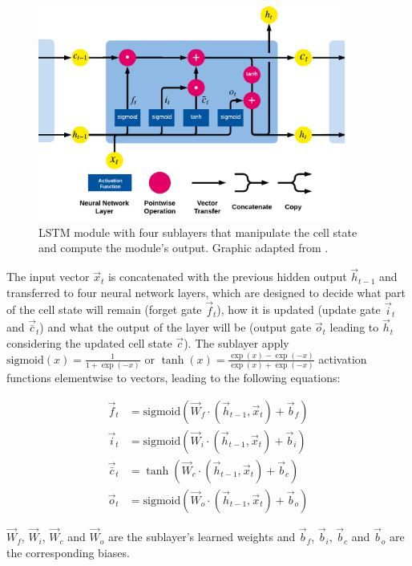 \begin{figure}[htbp!]
	\centering
	\includegraphics[width=0.9\textwidth]{figures/lstm-module}
	\caption[Structure of an LSTM module]{LSTM module with four sublayers that manipulate the cell state and compute the module's output. Graphic adapted from \cite{lstm-blog}.}
	\label{fig:lstm-module}
\end{figure}

The input vector $\vec{x}_t$ is concatenated with the previous hidden output $\vec{h}_{t-1}$ and transferred to four neural network layers, which are designed to decide what part of the cell state will remain (forget gate $\vec{f}_t$), how it is updated (update gate $\vec{i}_t$ and $\vec{\bar{c}}_t$) and what the output of the layer will be (output gate $\vec{o}_t$ leading to $\vec{h}_t$ considering the updated cell state $\vec{c}$).
The sublayer apply $\text{sigmoid}(x) = \frac{1}{1+\exp({-x})}$ or $\tanh(x) = \frac{\exp({x}) - \exp({-x})}{\exp({x}) + \exp({-x})}$ activation functions elementwise to vectors, leading to the following equations:

\begin{align*}
\vec{f}_t & = \text{sigmoid}(\vec{W}_f \cdot (\vec{h}_{t-1}, \vec{x}_t) + \vec{b}_f) \\
\vec{i}_t & =  \text{sigmoid} (\vec{W}_i \cdot (\vec{h}_{t-1}, \vec{x}_t) + \vec{b}_i) \\
\vec{\bar{c}}_t & = \tanh (\vec{W}_c \cdot (\vec{h}_{t-1}, \vec{x}_t) + \vec{b}_c) \\
\vec{o}_t & =  \text{sigmoid} (\vec{W}_o \cdot (\vec{h}_{t-1}, \vec{x}_t) + \vec{b}_o)
\end{align*}

$\vec{W}_f$, $\vec{W}_i$, $\vec{W}_c$ and $\vec{W}_o$ are the sublayer's learned weights and $\vec{b}_f$, $\vec{b}_i$, $\vec{b}_c$ and $\vec{b}_o$ are the corresponding biases.

